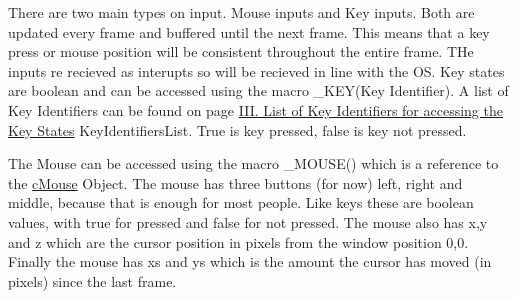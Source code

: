 There are two main types on input. Mouse inputs and Key inputs. Both are updated every frame and buffered until the next frame. This means that a key press or mouse position will be consistent throughout the entire frame. THe inputs re recieved as interupts so will be recieved in line with the OS. Key states are boolean and can be accessed using the macro \_\-KEY(Key Identifier). A list of Key Identifiers can be found on page \hyperlink{_key_identifiers_list}{III. List of Key Identifiers for accessing the Key States} KeyIdentifiersList. True is key pressed, false is key not pressed.\par
 \par
 The Mouse can be accessed using the macro \_\-MOUSE() which is a reference to the \hyperlink{classc_mouse}{cMouse} Object. The mouse has three buttons (for now) left, right and middle, because that is enough for most people. Like keys these are boolean values, with true for pressed and false for not pressed. The mouse also has x,y and z which are the cursor position in pixels from the window position 0,0. Finally the mouse has xs and ys which is the amount the cursor has moved (in pixels) since the last frame. 